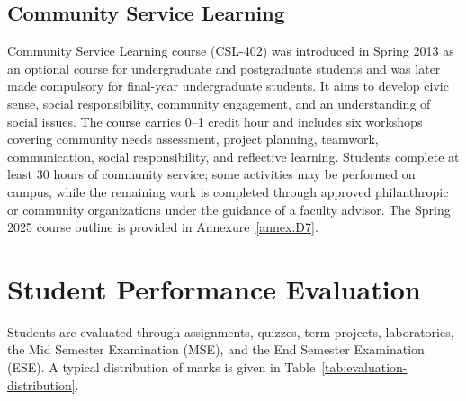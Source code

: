 \subsection{Community Service Learning}
\label{sec:community-service}

Community Service Learning course (CSL-402) was introduced in Spring 2013 as an optional course for undergraduate and postgraduate students and was later made compulsory for final-year undergraduate students. It aims to develop civic sense, social responsibility, community engagement, and an understanding of social issues. The course carries 0--1 credit hour and includes six workshops covering community needs assessment, project planning, teamwork, communication, social responsibility, and reflective learning. Students complete at least 30 hours of community service; some activities may be performed on campus, while the remaining work is completed through approved philanthropic or community organizations under the guidance of a faculty advisor. The Spring 2025 course outline is provided in Annexure~\ref{annex:D7}.

\section{Student Performance Evaluation}
\label{sec:performance-evaluation}

Students are evaluated through assignments, quizzes, term projects, laboratories, the Mid Semester Examination (MSE), and the End Semester Examination (ESE). A typical distribution of marks is given in Table~\ref{tab:evaluation-distribution}.

\begin{table}[H]
\footnotesize
\centering
\caption{Typical Student Performance Evaluation}
\label{tab:evaluation-distribution}
\end{table}

